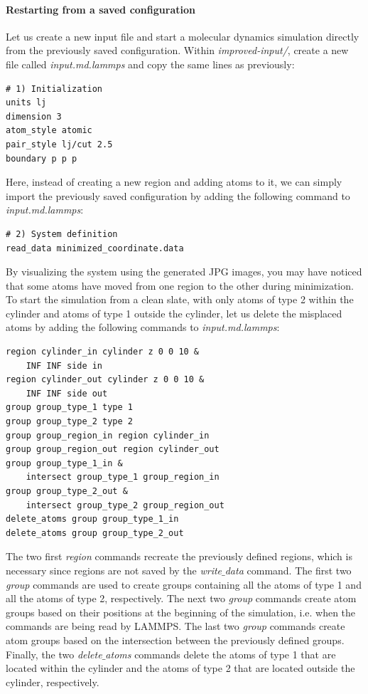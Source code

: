 \documentclass[9pt,tutorial]{livecoms}
\begin{document}
\paragraph{Restarting from a saved configuration}
Let us create a new input file and start a molecular dynamics simulation directly from the previously saved configuration. Within \textit{improved-input/}, create a new file called \textit{input.md.lammps} and copy the same lines as previously:
{\normalsize \begin{verbatim}
# 1) Initialization
units lj
dimension 3
atom_style atomic
pair_style lj/cut 2.5
boundary p p p
\end{verbatim}}
Here, instead of creating a new region and adding atoms to it, we can simply import the previously saved configuration by adding the following command to \textit{input.md.lammps}:
{\normalsize \begin{verbatim}
# 2) System definition
read_data minimized_coordinate.data
\end{verbatim}}
By visualizing the system using the generated JPG images, you may have noticed that some atoms have moved from one region to the other during minimization. To start the simulation from a clean slate, with only atoms of type 2 within the cylinder and atoms of type 1 outside the cylinder, let us delete the misplaced atoms by adding the following commands to \textit{input.md.lammps}:
{\normalsize \begin{verbatim}
region cylinder_in cylinder z 0 0 10 &
    INF INF side in
region cylinder_out cylinder z 0 0 10 &
    INF INF side out
group group_type_1 type 1
group group_type_2 type 2
group group_region_in region cylinder_in
group group_region_out region cylinder_out
group group_type_1_in &
    intersect group_type_1 group_region_in
group group_type_2_out &
    intersect group_type_2 group_region_out
delete_atoms group group_type_1_in
delete_atoms group group_type_2_out
\end{verbatim}}
The two first \textit{region} commands recreate the previously defined regions, which is necessary since regions are not saved by the \textit{write$\_$data} command. The first two \textit{group} commands are used to create groups containing all the atoms of type 1 and all the atoms of type 2, respectively. The next two \textit{group} commands create atom groups based on their positions at the beginning of the simulation, i.e. when the commands are being read by LAMMPS. The last two \textit{group} commands create atom groups based on the intersection between the previously defined groups. Finally, the two \textit{delete$\_$atoms} commands delete the atoms of type 1 that are located within the cylinder and the atoms of type 2 that are located outside the cylinder, respectively.
\end{document}
